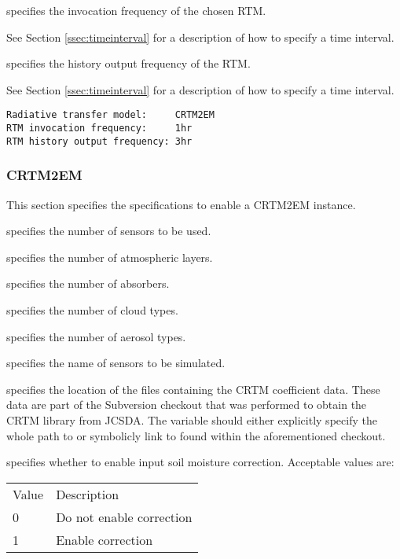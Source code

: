   specifies the invocation frequency
 of the chosen RTM.

 See Section \ref{ssec:timeinterval} for a description
 of how to specify a time interval.

  specifies the history
 output frequency of the RTM.

 See Section \ref{ssec:timeinterval} for a description
 of how to specify a time interval.
 

 \begin{Verbatim}[frame=single]
Radiative transfer model:     CRTM2EM
RTM invocation frequency:     1hr  
RTM history output frequency: 3hr
 \end{Verbatim}



 \subsubsection{CRTM2EM} \label{ssec:crtm2em}
 This section specifies the specifications to enable a CRTM2EM instance.

  specifies the number of sensors
 to be used.

  specifies the number of atmospheric
 layers.

  specifies the number of absorbers.

  specifies the number of cloud types.

  specifies the number of aerosol types.

  specifies the name of sensors to be simulated.

  specifies the location of the files
 containing the CRTM coefficient data.  These data are part of the
 Subversion checkout that was performed to obtain the CRTM library
 from JCSDA.  The  variable should
 either explicitly specify the whole path to or symbolicly link to 
  found within the
 aforementioned checkout. 

  specifies whether to
 enable input soil moisture correction.
 Acceptable values are:

 \begin{tabular}{ll}
 Value & Description              \\
 0     & Do not enable correction \\
 1     & Enable correction        \\
 \end{tabular}

